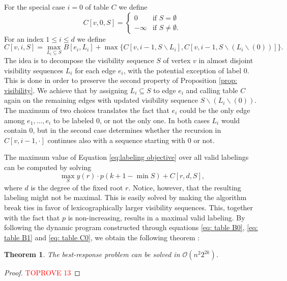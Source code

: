 \documentclass[11pt]{article}
\newtheorem{theorem}{Theorem}[section]
\newcommand\+{\mkern2mu}
\begin{document}
For the special case $i=0$ of table $C$ we define 
\begin{equation}  \label{eq: table C0}
C[v,0,S]=
\begin{cases}
0 &\text{if } S=\emptyset \\
-\infty & \text{if }S\neq \emptyset.
\end{cases}
\end{equation}
For an index $1\leq i\leq d$ we define
\begin{equation} \label{eq: table C1}
    C[v, i, S] = 
        \max_{L_i \subseteq S} B[e_i, L_i] + 
        \max\{ C[v, i-1, S \backslash L_i ], C[v, i-1, S \backslash (L_i \backslash (0))]\}.
\end{equation}
The idea is to decompose the visibility sequence $S$ of vertex $v$ in almost disjoint visibility sequences $L_i$ for each edge $e_i$, with the potential exception of label $0$. This is done in order to preserve the second property of Proposition \ref{prop: visibility}. We achieve that by assigning $L_i \subseteq S$ to edge $e_i$ and calling table $C$ again on the remaining edges with updated visibility sequence $S \backslash (L_i \backslash (0))$. The maximum of two choices translates the fact that $e_i$ could be the only edge among $e_1,\ldots,e_i$ to be labeled 0, or not the only one. In both cases $L_i$ would contain $0$, but in the second case determines whether the recursion in $C[v,i-1,\cdot]$ continues also with a sequence starting with 0 or not.

The maximum value of Equation \eqref{eq:labeling objective} over all valid labelings can be computed by solving
\begin{equation} \label{eq: DP equation}
\max_{S} y(r) \cdot p(k+1-\min S) +  C[r, d, S],    
\end{equation}
where $d$ is the degree of the fixed root $r$. Notice, however, that the resulting labeling might not be maximal. This is easily solved by making the algorithm break ties in favor of lexicographically larger visibility sequences. This, together with the fact that $p$ is non-increasing, results in a maximal valid labeling. By following the dynamic program constructed through equations \ref{eq: table B0}, \ref{eq: table B1} and \ref{eq: table C0}, we obtain the following theorem :

\begin{theorem}
    The best-response problem can be solved in $\mathcal{O}(n^2 2^{2k})$.
\end{theorem}
\begin{proof}\textcolor{red}{TOPROVE 13}\end{proof}
\end{document}
